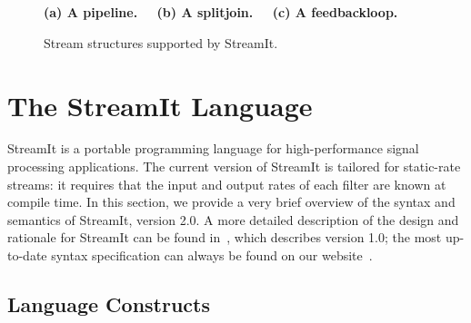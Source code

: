 \begin{figure}[t]
\begin{center}
\begin{minipage}{0.46in}
\centering
{} \\
\end{minipage} 
~
\begin{minipage}{1.3in}
\centering
{} \\
\end{minipage}
~
\begin{minipage}{1.02in}
\centering
{} \\
\end{minipage} 
\\ ~ \\ {\bf \protect\small (a) A pipeline. ~~(b) A splitjoin. ~~(c) A feedbackloop.}
\caption{\protect\small Stream structures supported by StreamIt.
\protect\label{fig:structures}}
\end{center}
\end{figure}

\section{The StreamIt Language}
\label{sec:streamit}

StreamIt is a portable programming language for high-performance
signal processing applications.  The current version of StreamIt is
tailored for static-rate streams: it requires that the input and
output rates of each filter are known at compile time.  In this
section, we provide a very brief overview of the syntax and semantics
of StreamIt, version 2.0.  A more detailed description of the design
and rationale for StreamIt can be found in~\cite{streamitcc}, which
describes version 1.0; the most up-to-date syntax specification can
always be found on our website~\cite{streamitweb}.

\subsection{Language Constructs}

